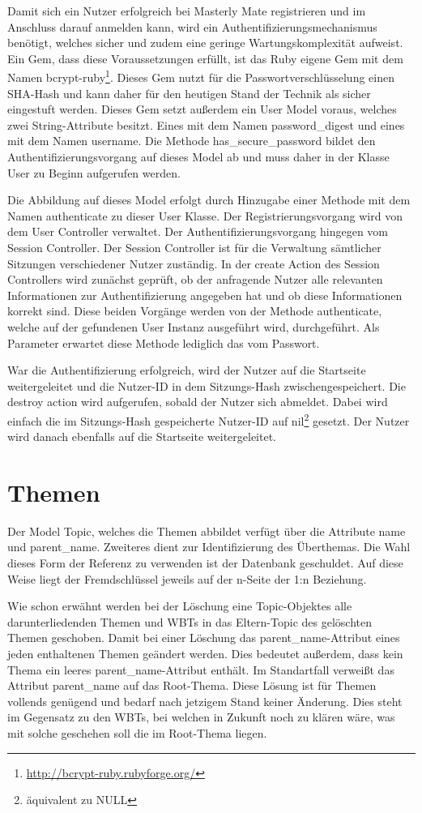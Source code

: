 Damit sich ein Nutzer erfolgreich bei
Masterly Mate registrieren und im Anschluss darauf anmelden kann, wird ein
Authentifizierungsmechanismus benötigt, welches sicher und zudem eine geringe
Wartungskomplexität aufweist. Ein Gem, dass diese Voraussetzungen erfüllt, ist
das Ruby eigene Gem mit dem Namen bcrypt-ruby\footnote{\url{http://bcrypt-ruby.rubyforge.org/}}. Dieses Gem nutzt für die
Passwortverschlüsselung einen SHA-Hash und kann daher für den
heutigen Stand der Technik als sicher eingestuft werden. Dieses Gem setzt
außerdem ein User Model voraus, welches zwei String-Attribute besitzt. Eines mit
dem Namen password\_digest und eines mit dem Namen username. Die Methode
has\_secure\_password bildet den Authentifizierungsvorgang auf dieses Model ab
und muss daher in der Klasse User zu Beginn aufgerufen werden. 

Die Abbildung auf
dieses Model erfolgt durch Hinzugabe einer Methode mit dem Namen authenticate zu
dieser User Klasse. Der Registrierungsvorgang wird von dem User Controller
verwaltet. Der Authentifizierungsvorgang hingegen vom Session Controller. Der
Session Controller ist für die Verwaltung sämtlicher Sitzungen verschiedener Nutzer
zuständig. In der create Action des Session Controllers wird zunächst geprüft,
ob der anfragende Nutzer alle relevanten Informationen zur Authentifizierung
angegeben hat und ob diese Informationen korrekt sind. Diese beiden Vorgänge
werden von der Methode authenticate, welche auf der gefundenen User
Instanz ausgeführt wird, durchgeführt. Als Parameter erwartet diese Methode lediglich
das vom Passwort. 

War die Authentifizierung erfolgreich, wird der Nutzer auf die
Startseite weitergeleitet und die Nutzer-ID in dem
Sitzungs-Hash zwischengespeichert. Die destroy action wird aufgerufen, sobald
der Nutzer sich abmeldet. Dabei wird einfach die im Sitzungs-Hash gespeicherte
Nutzer-ID auf nil\footnote{äquivalent zu NULL} gesetzt. Der Nutzer wird danach
ebenfalls auf die Startseite weitergeleitet. 

\section{Themen}
Der Model Topic, welches die Themen abbildet verfügt über die Attribute name und
parent\_name. Zweiteres dient zur Identifizierung des Überthemas. Die Wahl
dieses Form der Referenz zu verwenden ist der Datenbank geschuldet. Auf diese Weise
liegt der Fremdschlüssel jeweils auf der n-Seite der 1:n Beziehung.

Wie schon erwähnt werden bei der Löschung eine Topic-Objektes alle
darunterliedenden Themen und WBTs in das Eltern-Topic des gelöschten Themen
geschoben. Damit bei einer Löschung das parent\_name-Attribut eines jeden
enthaltenen Themen geändert werden. Dies bedeutet außerdem, dass kein Thema ein
leeres parent\_name-Attribut enthält. Im Standartfall verweißt das
Attribut parent\_name auf das Root-Thema. Diese Lösung ist für Themen vollends
genügend und bedarf nach jetzigem Stand keiner Änderung. Dies steht im Gegensatz
zu den WBTs, bei welchen in Zukunft noch zu klären wäre, was mit solche
geschehen soll die im Root-Thema liegen. 
